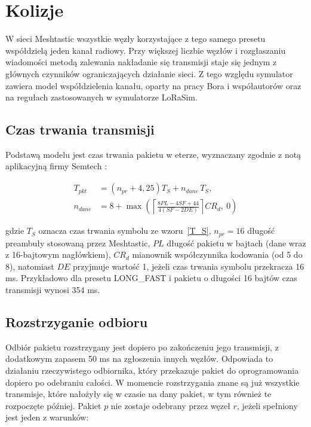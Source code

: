 \section{Kolizje}

W sieci Meshtastic wszystkie węzły korzystające z tego samego presetu współdzielą jeden kanał radiowy. Przy większej liczbie węzłów i rozgłaszaniu wiadomości metodą zalewania nakładanie się transmisji staje się jednym z głównych czynników ograniczających działanie sieci. Z tego względu symulator zawiera model współdzielenia kanału, oparty na pracy Bora i współautorów \cite{bor2016} oraz na regułach zastosowanych w symulatorze LoRaSim.

\subsection{Czas trwania transmisji}

Podstawą modelu jest czas trwania pakietu w eterze, wyznaczany zgodnie z notą aplikacyjną firmy Semtech \cite{semtech_an1200_13}:

\begin{equation}\label{eq:airtime}
\begin{split}
T_{pkt} &= \left(n_{pr} + 4{,}25\right) T_S + n_{dane}\, T_S, \\
n_{dane} &= 8 + \max\left(\left\lceil \frac{8PL - 4SF + 44}{4(SF - 2DE)} \right\rceil CR_d,\ 0\right)
\end{split}
\end{equation}

gdzie \(T_S\) oznacza czas trwania symbolu ze wzoru~\eqref{T_S}, \(n_{pr} = 16\) długość preambuły stosowaną przez Meshtastic, \(PL\) długość pakietu w bajtach (dane wraz z 16-bajtowym nagłówkiem), \(CR_d\) mianownik współczynnika kodowania (od 5 do 8), natomiast \(DE\) przyjmuje wartość 1, jeżeli czas trwania symbolu przekracza 16 ms. Przykładowo dla presetu LONG\_FAST i pakietu o długości 16 bajtów czas transmisji wynosi 354 ms.

\subsection{Rozstrzyganie odbioru}

Odbiór pakietu rozstrzygany jest dopiero po zakończeniu jego transmisji, z dodatkowym zapasem 50 ms na zgłoszenia innych węzłów. Odpowiada to działaniu rzeczywistego odbiornika, który przekazuje pakiet do oprogramowania dopiero po odebraniu całości. W momencie rozstrzygania znane są już wszystkie transmisje, które nałożyły się w czasie na dany pakiet, w tym również te rozpoczęte później. Pakiet \(p\) nie zostaje odebrany przez węzeł \(r\), jeżeli spełniony jest jeden z warunków:

